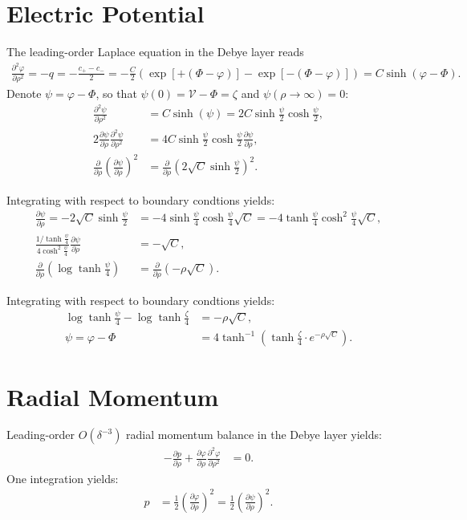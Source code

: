 \documentclass[MSc,beforeExam]{iitcsthesis}
\newcommand{\deriv}[2]{\frac{\partial #1}{\partial #2}}
\newcommand{\pars}[1]{\left(#1\right)}
\newcommand\cV{\mathscr{V}}
\begin{document}
\section{Electric Potential}
The leading-order Laplace equation in the Debye layer reads
\begin{align}  
\deriv{^2 \varphi}{\rho^2} = -q = -\frac{c_+ - c_-}{2} = 
-\frac{C}{2} \pars{\exp\left[+(\varPhi - \varphi)\right] - \exp\left[-(\varPhi - \varphi)\right]} = C \sinh(\varphi - \varPhi).
\end{align}
Denote $\psi = \varphi - \varPhi$, so that $\psi(0) = \cV - \varPhi = \zeta$ and 
$\psi(\rho\rightarrow\infty) = 0$:
\begin{align}
\nonumber
\deriv{^2 \psi}{\rho^2} &= C \sinh(\psi) = 2 C \sinh{\frac{\psi}{2}}\cosh{\frac{\psi}{2}} ,
\\
2\deriv{\psi}{\rho} \deriv{^2 \psi}{\rho^2} &= 
4 C \sinh{\frac{\psi}{2}}\cosh{\frac{\psi}{2}} \deriv{\psi}{\rho} ,
\\ \nonumber
\deriv{}{\rho} \pars{\deriv{\psi}{\rho}}^2 &= 
\deriv{}{\rho} \pars{2 \sqrt{C} \sinh{\frac{\psi}{2}}}^2 .
\end{align}  

Integrating with respect to boundary condtions yields:
\begin{align}  
\nonumber
\deriv{\psi}{\rho} = -2\sqrt{C}\sinh\frac{\psi}{2} &= 
-4\sinh\frac{\psi}{4}\cosh\frac{\psi}{4} \sqrt{C} = 
-4\tanh\frac{\psi}{4}\cosh^2\frac{\psi}{4} \sqrt{C}, \\  
\frac{1/{\tanh\frac{\psi}{4}}}{4\cosh^2\frac{\psi}{4}}
\deriv{\psi}{\rho}
&= -\sqrt{C}, \\  
\nonumber
\deriv{}{\rho}\pars{\log\tanh\frac{\psi}{4}} &= \deriv{}{\rho}\pars{-\rho \sqrt{C}} .
\end{align}

Integrating with respect to boundary condtions yields:
\begin{align}
\nonumber
\log\tanh\frac{\psi}{4} - \log\tanh\frac{\zeta}{4} &= -\rho \sqrt{C}, \\
\psi = \varphi - \varPhi &= 
4 \tanh^{-1}\pars{\tanh{\frac{\zeta}{4}} \cdot e^{-\rho \sqrt{C}}}.
\end{align}

\section{Radial Momentum}
Leading-order $O(\delta^{-3})$ radial momentum balance in the Debye layer yields:
\begin{align} 
- \deriv{p}{\rho} + \deriv{\varphi}{\rho} \deriv{^2\varphi}{\rho^2} &= 0.
\end{align}
One integration yields:
\begin{align} 
p &= \frac{1}{2}\pars{\deriv{\varphi}{\rho}}^2 = \frac{1}{2}\pars{\deriv{\psi}{\rho}}^2.
\end{align}
\end{document}
